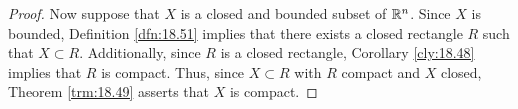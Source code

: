\documentclass[../main.tex]{subfiles}
\begin{document}
\begin{theorem}
\begin{proof}
        Now suppose that $X$ is a closed and bounded subset of $\mathbb{R}^n$. Since $X$ is bounded, Definition \ref{dfn:18.51} implies that there exists a closed rectangle $R$ such that $X\subset R$. Additionally, since $R$ is a closed rectangle, Corollary \ref{cly:18.48} implies that $R$ is compact. Thus, since $X\subset R$ with $R$ compact and $X$ closed, Theorem \ref{trm:18.49} asserts that $X$ is compact.
    \end{proof}
\end{theorem}
\end{document}
